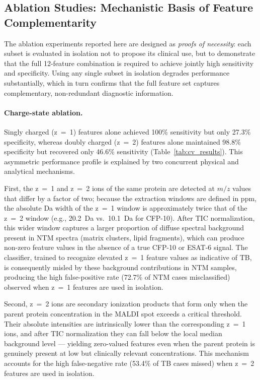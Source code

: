 \documentclass[journal=ancham, manuscript=article, layout=traditional]{achemso}
\begin{document}
\subsection{Ablation Studies: Mechanistic Basis of Feature
  Complementarity}
\label{sec:ablation}

The ablation experiments reported here are designed as \textit{proofs
of necessity}: each subset is evaluated in isolation not to propose
its clinical use, but to demonstrate that the full 12-feature
combination is required to achieve jointly high sensitivity and
specificity.
Using any single subset in isolation degrades performance
substantially, which in turn confirms that the full feature set
captures complementary, non-redundant diagnostic information.

\paragraph{Charge-state ablation.}
Singly charged (z~=~1) features alone achieved 100\% sensitivity
but only 27.3\% specificity, whereas doubly charged (z~=~2) features
alone maintained 98.8\% specificity but recovered only 46.6\%
sensitivity (Table~\ref{tab:cv_results}).
This asymmetric performance profile is explained by two concurrent
physical and analytical mechanisms.

First, the z~=~1 and z~=~2 ions of the same protein are detected
at $m/z$ values that differ by a factor of two; because the
extraction windows are defined in ppm, the absolute Da width of the
z~=~1 window is approximately twice that of the z~=~2 window
(e.g., \SI{20.2}{\dalton} vs.\ \SI{10.1}{\dalton} for CFP-10).
After TIC normalization, this wider window captures a larger
proportion of diffuse spectral background present in NTM spectra
(matrix clusters, lipid fragments), which can produce non-zero
feature values in the absence of a true CFP-10 or ESAT-6 signal.
The classifier, trained to recognize elevated z~=~1 feature values
as indicative of TB, is consequently misled by these background
contributions in NTM samples, producing the high false-positive rate
(72.7\% of NTM cases misclassified) observed when z~=~1 features
are used in isolation.

Second, z~=~2 ions are secondary ionization products that form
only when the parent protein concentration in the MALDI spot exceeds
a critical threshold.\cite{Gross2004MS}
Their absolute intensities are intrinsically lower than the
corresponding z~=~1 ions, and after TIC normalization they can
fall below the local median background level --- yielding zero-valued
features even when the parent protein is genuinely present at low
but clinically relevant concentrations.
This mechanism accounts for the high false-negative rate (53.4\% of
TB cases missed) when z~=~2 features are used in isolation.
\end{document}
